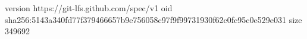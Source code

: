 version https://git-lfs.github.com/spec/v1
oid sha256:5143a340fd77f379466657b9e756058c97f9f99731930f62c0fc95c0e529e031
size 349692
